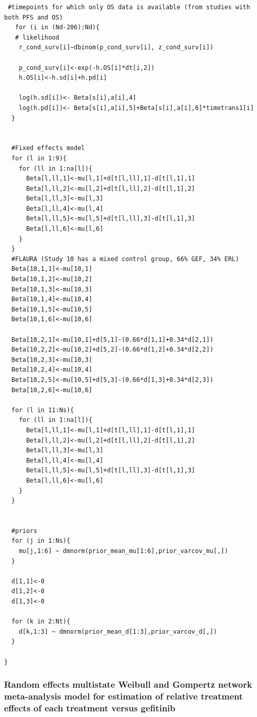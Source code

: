 \documentclass[11pt,final,fleqn]{article}\usepackage[]{graphicx}\usepackage[]{color}
\theoremstyle{plain}
\begin{document}
\begin{appendices}
\begin{verbatim}
 #timepoints for which only OS data is available (from studies with both PFS and OS)
   for (i in (Nd-206):Nd){
   # likelihood
    r_cond_surv[i]~dbinom(p_cond_surv[i], z_cond_surv[i]) 
    
    p_cond_surv[i]<-exp(-h.OS[i]*dt[i,2])
    h.OS[i]<-h.sd[i]+h.pd[i]
    
    log(h.sd[i])<- Beta[s[i],a[i],4] 
    log(h.pd[i])<- Beta[s[i],a[i],5]+Beta[s[i],a[i],6]*timetrans1[i]
  }
    
 
  #Fixed effects model
  for (l in 1:9){
    for (ll in 1:na[l]){
      Beta[l,ll,1]<-mu[l,1]+d[t[l,ll],1]-d[t[l,1],1]
      Beta[l,ll,2]<-mu[l,2]+d[t[l,ll],2]-d[t[l,1],2]
      Beta[l,ll,3]<-mu[l,3]
      Beta[l,ll,4]<-mu[l,4]
      Beta[l,ll,5]<-mu[l,5]+d[t[l,ll],3]-d[t[l,1],3]
      Beta[l,ll,6]<-mu[l,6]
    }
  }
  #FLAURA (Study 10 has a mixed control group, 66% GEF, 34% ERL)
  Beta[10,1,1]<-mu[10,1]
  Beta[10,1,2]<-mu[10,2]
  Beta[10,1,3]<-mu[10,3]
  Beta[10,1,4]<-mu[10,4]
  Beta[10,1,5]<-mu[10,5]
  Beta[10,1,6]<-mu[10,6]
  
  Beta[10,2,1]<-mu[10,1]+d[5,1]-(0.66*d[1,1]+0.34*d[2,1])
  Beta[10,2,2]<-mu[10,2]+d[5,2]-(0.66*d[1,2]+0.34*d[2,2])
  Beta[10,2,3]<-mu[10,3]
  Beta[10,2,4]<-mu[10,4]
  Beta[10,2,5]<-mu[10,5]+d[5,3]-(0.66*d[1,3]+0.34*d[2,3])
  Beta[10,2,6]<-mu[10,6]
  
  for (l in 11:Ns){
    for (ll in 1:na[l]){
      Beta[l,ll,1]<-mu[l,1]+d[t[l,ll],1]-d[t[l,1],1]
      Beta[l,ll,2]<-mu[l,2]+d[t[l,ll],2]-d[t[l,1],2]
      Beta[l,ll,3]<-mu[l,3]
      Beta[l,ll,4]<-mu[l,4]
      Beta[l,ll,5]<-mu[l,5]+d[t[l,ll],3]-d[t[l,1],3]
      Beta[l,ll,6]<-mu[l,6]
    }
  }
  
  
  #priors
  for (j in 1:Ns){
    mu[j,1:6] ~ dmnorm(prior_mean_mu[1:6],prior_varcov_mu[,]) 
  }
  
  d[1,1]<-0
  d[1,2]<-0
  d[1,3]<-0

  for (k in 2:Nt){
    d[k,1:3] ~ dmnorm(prior_mean_d[1:3],prior_varcov_d[,]) 
  }
  
}

\end{verbatim}


\subsubsection{Random effects multistate Weibull and Gompertz network meta-analysis model for estimation of relative treatment effects of each treatment versus gefitinib}
\begin{verbatim} 


\end{verbatim}
\end{appendices}
\end{document}
